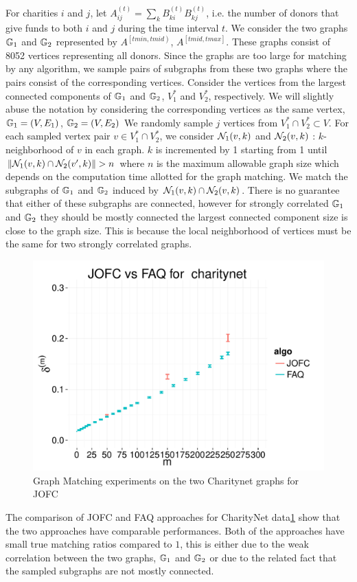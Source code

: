\documentclass[12pt,oneside,final]{thesis}
\begin{document}
For charities $i$ and $j$,
let $A_{ij}^{(t)}= \sum_{k}{B_{ki}^{(t)}B_{kj}^{(t)}}$, i.e. the number of donors that give funds to both $i$ and $j$  during the time interval $t$.
We consider the two graphs $\mathbb{G}_1$ and $\mathbb{G}_2$ represented by  $A^{\left[ tmin,tmid \right)}$, $A^{\left[ tmid,tmax\right]}$. These graphs consist of 8052   vertices representing all donors. Since the graphs are too large for matching by any algorithm, we sample pairs of subgraphs from these two graphs where the pairs consist of the corresponding vertices. Consider the vertices from the largest connected components of $\mathbb{G}_1$ and $\mathbb{G}_2$, $V_1^*$ and $V_2^*$, respectively. We will slightly abuse the  notation by considering the corresponding vertices as the same vertex, \ie $\mathbb{G}_1= (V,E_1)$, $\mathbb{G}_2= (V,E_2)$ We randomly sample $j$ vertices from  $V_1^* \cap V_2^* \subset V$. For each sampled vertex  pair $v \in V_1^* \cap V_2^*$, we consider $\mathcal{N}_1(v,k)$ and $\mathcal{N}_2(v,k)$ : $k$-neighborhood of $v$  in each graph. $k$ is incremented by 1 starting from 1 until   $\| \mcN_1(v,k) \cap\mcN_2(v',k)\|>n$ where $n$ is the maximum allowable graph size which depends on the computation time allotted for the graph matching. We match the  subgraphs of $\mathbb{G}_1$ and $\mathbb{G}_2$ induced by $\mathcal{N}_1(v,k) \cap\mathcal{N}_2(v,k)$. There is no guarantee that   either of these subgraphs are connected, however for strongly correlated $\mathbb{G}_1$ and $\mathbb{G}_2$ they should be mostly connected \ie the largest connected component size  is close to the graph size. This is because the local neighborhood of vertices must be the same for two strongly correlated graphs.

\begin{figure}
\includegraphics[scale=0.4]{charitynet_SGM_JOFCvsFAQ}
\caption{Graph Matching experiments on the two Charitynet graphs for JOFC \label{charitynet_graphmatch}}
\end{figure}
The comparison of JOFC and FAQ  approaches for CharityNet data\ref{charitynet_graphmatch} show that the two approaches have comparable performances. Both of the approaches have small true matching ratios compared to $1$, this is either  due to the weak correlation between the two graphs, $\mathbb{G}_1$ and $\mathbb{G}_2$ or due to the related fact that the sampled subgraphs are not mostly connected.
\end{document}
